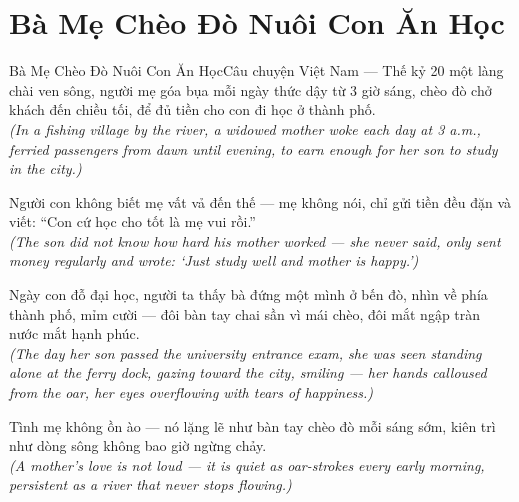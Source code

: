 \section{Bà Mẹ Chèo Đò Nuôi Con Ăn Học}
\begin{truyen}{Bà Mẹ Chèo Đò Nuôi Con Ăn Học}{Câu chuyện Việt Nam --- Thế kỷ 20}
 một làng chài ven sông, người mẹ góa bụa mỗi ngày thức dậy từ 3 giờ sáng, chèo đò chở khách đến chiều tối, để đủ tiền cho con đi học ở thành phố.\\[4pt]
\textit{(In a fishing village by the river, a widowed mother woke each day at 3 a.m., ferried passengers from dawn until evening, to earn enough for her son to study in the city.)}

Người con không biết mẹ vất vả đến thế --- mẹ không nói, chỉ gửi tiền đều đặn và viết: ``Con cứ học cho tốt là mẹ vui rồi.''\\[4pt]
\textit{(The son did not know how hard his mother worked --- she never said, only sent money regularly and wrote: `Just study well and mother is happy.')}

Ngày con đỗ đại học, người ta thấy bà đứng một mình ở bến đò, nhìn về phía thành phố, mỉm cười --- đôi bàn tay chai sần vì mái chèo, đôi mắt ngập tràn nước mắt hạnh phúc.\\[4pt]
\textit{(The day her son passed the university entrance exam, she was seen standing alone at the ferry dock, gazing toward the city, smiling --- her hands calloused from the oar, her eyes overflowing with tears of happiness.)}

\end{truyen}
\begin{baihoc}
  Tình mẹ không ồn ào --- nó lặng lẽ như bàn tay chèo đò mỗi sáng sớm, kiên trì như dòng sông không bao giờ ngừng chảy.\\[4pt]
  \textit{(A mother's love is not loud --- it is quiet as oar-strokes every early morning, persistent as a river that never stops flowing.)}
\end{baihoc}

